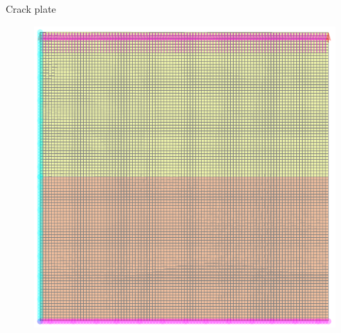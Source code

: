 \documentclass[aspectratio=169,xcolor=dvipsnames]{beamer}
\begin{document}
\begin{frame}{Crack plate}
\begin{figure}
\begin{minipage}{\linewidth}
\begin{minipage}{0.65\linewidth}
\begin{minipage}[b]{0.3\linewidth}
				\includegraphics[width=\linewidth]{plate_425_1054.pdf}
					 \fontsize{3pt}{4pt}
			\end{minipage}\hfill
		\end{minipage}
\end{minipage}
\begin{minipage}{\linewidth}
	\centering
		\begin{minipage}[c]{0.25\linewidth}
 \fontsize{3pt}{4pt}\selectfont{
	\def\svgwidth{\linewidth}
	}
	\end{minipage}\hfill
	\begin{minipage}[c]{0.26\linewidth}
	\fontsize{3pt}{4pt}\selectfont{
		\def\svgwidth{\linewidth}
		}
\end{minipage}\hfill
	\begin{minipage}[c]{0.22\linewidth}
	 \fontsize{3pt}{4pt}\selectfont{
		\def\svgwidth{\linewidth}
		}
	\end{minipage}\hfill
	\begin{minipage}[c]{0.27\linewidth}
	 \fontsize{3pt}{4pt}\selectfont{
	\def\svgwidth{\linewidth}
	}
\end{minipage}\hfill
	\end{minipage}
	\end{figure}

\end{frame}
\end{document}
